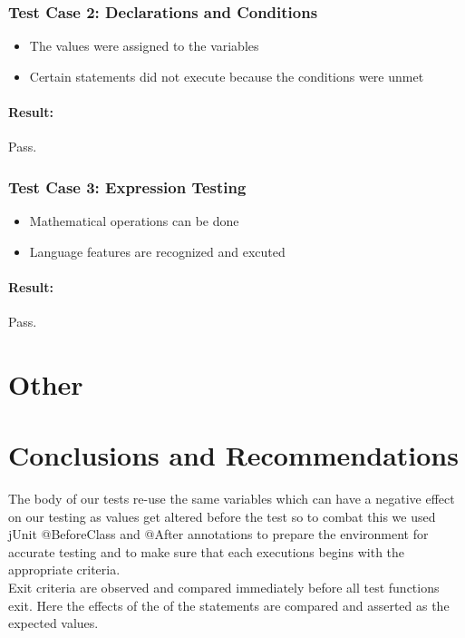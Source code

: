 \documentclass[english]{article}
\begin{document}
			\subsubsection{Test Case 2: Declarations and Conditions}
			\begin{itemize}
			\item The values were assigned to the variables\\
			
			\item Certain statements did not execute because the conditions were unmet\\
			\end{itemize}
						\paragraph{Result: } Pass.

			\subsubsection{Test Case 3: Expression Testing}
			\begin{itemize}
			\item Mathematical operations can be done\\
			
			\item Language features are recognized and excuted\\
			\end{itemize}
						\paragraph{Result: } Pass.

		\section{Other}
		\section{Conclusions and Recommendations}
		The body of our tests re-use the same variables which can have a negative effect on our testing as values get altered before the test so to combat this we used jUnit @BeforeClass and @After annotations to prepare the environment for accurate testing and to make sure that each executions begins with the appropriate criteria.
		\\[4pt]
		Exit criteria are observed and compared immediately before all test functions exit. Here the effects of the of the statements are compared and asserted as the expected values.
		
\end{document}

